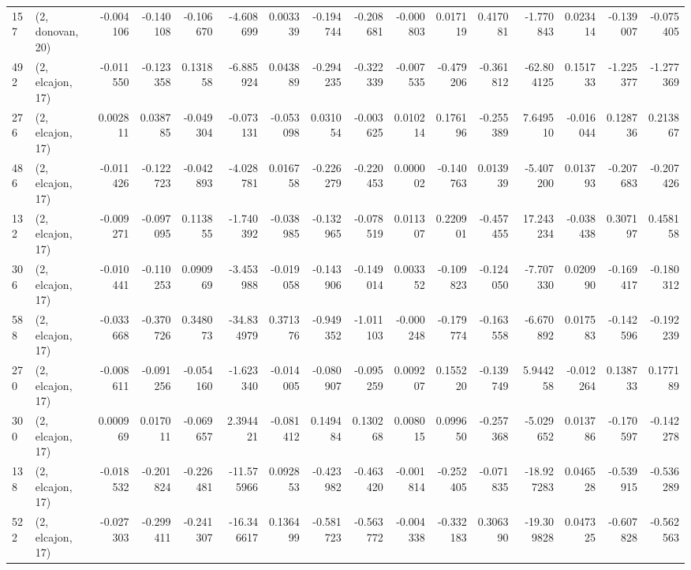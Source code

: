 \begin{tabular}{llrrrrrrrrrrrrrr}
157 &  (2, donovan, 20) &  -0.004106 & -0.140108 & -0.106670 &   -4.608699 &  0.003339 &  -0.194744 & -0.208681 & -0.000803 &  0.017119 &  0.417081 &   -1.770843 &  0.023414 & -0.139007 & -0.075405 \\
492 &  (2, elcajon, 17) &  -0.011550 & -0.123358 &  0.131858 &   -6.885924 &  0.043889 &  -0.294235 & -0.322339 & -0.007535 & -0.479206 & -0.361812 &  -62.804125 &  0.151733 & -1.225377 & -1.277369 \\
276 &  (2, elcajon, 17) &   0.002811 &  0.038785 & -0.049304 &   -0.073131 & -0.053098 &   0.031054 & -0.003625 &  0.010214 &  0.176196 & -0.255389 &    7.649510 & -0.016044 &  0.128736 &  0.213867 \\
486 &  (2, elcajon, 17) &  -0.011426 & -0.122723 & -0.042893 &   -4.028781 &  0.016758 &  -0.226279 & -0.220453 &  0.000002 & -0.140763 &  0.013939 &   -5.407200 &  0.013793 & -0.207683 & -0.207426 \\
132 &  (2, elcajon, 17) &  -0.009271 & -0.097095 &  0.113855 &   -1.740392 & -0.038985 &  -0.132965 & -0.078519 &  0.011307 &  0.220901 & -0.457455 &   17.243234 & -0.038438 &  0.307197 &  0.458158 \\
306 &  (2, elcajon, 17) &  -0.010441 & -0.110253 &  0.090969 &   -3.453988 & -0.019058 &  -0.143906 & -0.149014 &  0.003352 & -0.109823 & -0.124050 &   -7.707330 &  0.020990 & -0.169417 & -0.180312 \\
588 &  (2, elcajon, 17) &  -0.033668 & -0.370726 &  0.348073 &  -34.834979 &  0.371376 &  -0.949352 & -1.011103 & -0.000248 & -0.179774 & -0.163558 &   -6.670892 &  0.017583 & -0.142596 & -0.192239 \\
270 &  (2, elcajon, 17) &  -0.008611 & -0.091256 & -0.054160 &   -1.623340 & -0.014005 &  -0.080907 & -0.095259 &  0.009207 &  0.155220 & -0.139749 &    5.944258 & -0.012264 &  0.138733 &  0.177189 \\
300 &  (2, elcajon, 17) &   0.000969 &  0.017011 & -0.069657 &    2.394421 & -0.081412 &   0.149484 &  0.130268 &  0.008015 &  0.099650 & -0.257368 &   -5.029652 &  0.013786 & -0.170597 & -0.142278 \\
138 &  (2, elcajon, 17) &  -0.018532 & -0.201824 & -0.226481 &  -11.575966 &  0.092853 &  -0.423982 & -0.463420 & -0.001814 & -0.252405 & -0.071835 &  -18.927283 &  0.046528 & -0.539915 & -0.536289 \\
522 &  (2, elcajon, 17) &  -0.027303 & -0.299411 & -0.241307 &  -16.346617 &  0.136499 &  -0.581723 & -0.563772 & -0.004338 & -0.332183 &  0.306390 &  -19.309828 &  0.047325 & -0.607828 & -0.562563 \\

\end{tabular}
